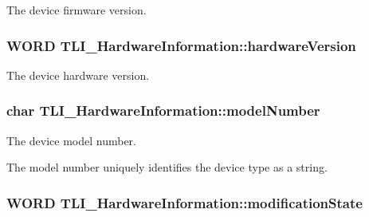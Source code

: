 The device firmware version. 

\subsubsection[{\texorpdfstring{hardware\+Version}{hardwareVersion}}]{\setlength{\rightskip}{0pt plus 5cm}W\+O\+RD T\+L\+I\+\_\+\+Hardware\+Information\+::hardware\+Version}\hypertarget{struct_t_l_i___hardware_information_a322185a1371c1f43d70aadcac092d96f}{}\label{struct_t_l_i___hardware_information_a322185a1371c1f43d70aadcac092d96f}


The device hardware version. 

\subsubsection[{\texorpdfstring{model\+Number}{modelNumber}}]{\setlength{\rightskip}{0pt plus 5cm}char T\+L\+I\+\_\+\+Hardware\+Information\+::model\+Number}\hypertarget{struct_t_l_i___hardware_information_ac16741feceb318566ac45778c5d86d46}{}\label{struct_t_l_i___hardware_information_ac16741feceb318566ac45778c5d86d46}


The device model number. 

The model number uniquely identifies the device type as a string. 
\subsubsection[{\texorpdfstring{modification\+State}{modificationState}}]{\setlength{\rightskip}{0pt plus 5cm}W\+O\+RD T\+L\+I\+\_\+\+Hardware\+Information\+::modification\+State}\hypertarget{struct_t_l_i___hardware_information_a8a6af93d1f1c64943eaf45cd5f307526}{}\label{struct_t_l_i___hardware_information_a8a6af93d1f1c64943eaf45cd5f307526}


